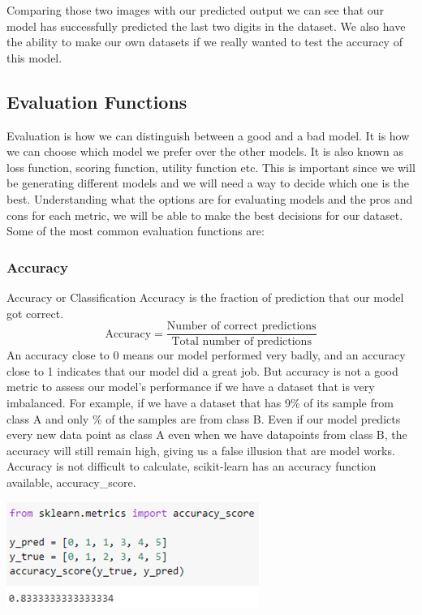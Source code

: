 \documentclass[a4paper,12pt]{report}
\begin{document}
Comparing those two images with our predicted output we can see that our model has successfully predicted the last two digits in the dataset. We also have the ability to make our own datasets if we really wanted to test the accuracy of this model.

\subsection{Evaluation Functions}

Evaluation is how we can distinguish between a good and a bad model. It is how we can choose which model we prefer over the other models. It is also known as loss function, scoring function, utility function etc. This is important since we will be generating different models and we will need a way to decide which one is the best. Understanding what the options are for evaluating models and the pros and cons for each metric, we will be able to make the best decisions for our dataset. Some of the most common evaluation functions are:

\subsubsection{Accuracy}

Accuracy or Classification Accuracy is the fraction of prediction that our model got correct.
$$\text{Accuracy}=\frac{\text{Number of correct predictions}}{\text{Total number of predictions}}$$
An accuracy close to 0 means our model performed very badly, and an accuracy close to 1 indicates that our model did a great job. But accuracy is not a good metric to assess our model’s performance if we have a dataset that is very imbalanced. For example, if we have a dataset that has 9\% of its sample from class A and only \% of the samples are from class B. Even if our model predicts every new data point as class A even when we have datapoints from class B, the accuracy will still remain high, giving us a false illusion that are model works. Accuracy is not difficult to calculate, scikit-learn has an accuracy function available, accuracy\_score.

\begin{center}
    \captionsetup{type=figure}
    \includegraphics[width=.9\linewidth]{media/AccuracyScore.png}
\end{center}
\end{document}
